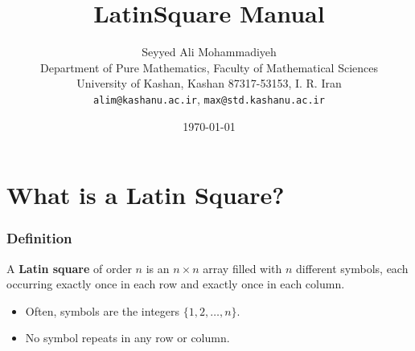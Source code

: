 \documentclass{beamer}
\title{LatinSquare Manual}
\author[S. A. Mohammadiyeh]{Seyyed Ali Mohammadiyeh\\
Department of Pure Mathematics, Faculty of Mathematical Sciences\\
University of Kashan, Kashan 87317-53153, I. R. Iran\\
\texttt{alim@kashanu.ac.ir}, \texttt{max@std.kashanu.ac.ir}}
\date{\today}
\begin{document}
\begin{frame}
  \titlepage
\end{frame}


\section{What is a Latin Square?}

\begin{frame}
\frametitle{Definition}
A \textbf{Latin square} of order $n$ is an $n \times n$ array filled with $n$ different symbols, each occurring exactly once in each row and exactly once in each column.
\pause
\begin{itemize}
  \item Often, symbols are the integers $\{1, 2, \dots, n\}$.
  \item No symbol repeats in any row or column.
\end{itemize}
\end{frame}




\end{document}
